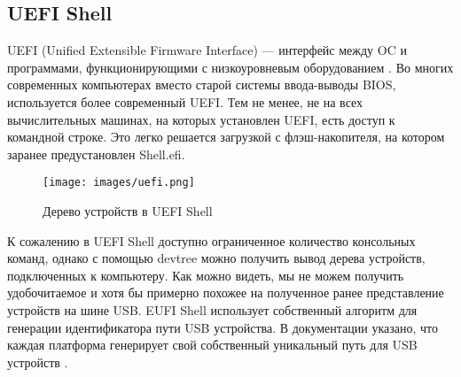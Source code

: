 \subsection{UEFI Shell}
UEFI (Unified Extensible Firmware Interface) — интерфейс между OC и программами, функционирующими с низкоуровневым оборудованием \cite{uefi}.
Во многих современных компьютерах вместо старой системы ввода-выводы BIOS, используется более современный UEFI. Тем не менее, не на всех
вычислительных машинах, на которых установлен UEFI, есть доступ к командной строке. Это легко решается загрузкой с флэш-накопителя, на котором
заранее предустановлен Shell.efi.
\begin{figure}[H]
  \texttt{[image: images/uefi.png]}
  \caption{Дерево устройств в UEFI Shell}
\end{figure}
К сожалению в UEFI Shell доступно ограниченное количество консольных команд, однако с помощью devtree можно получить вывод дерева устройств,
подключенных к компьютеру. Как можно видеть, мы не можем получить удобочитаемое и хотя бы примерно похожее на полученное ранее
представление устройств на шине USB. EUFI Shell использует собственный алгоритм для генерации идентификатора пути USB устройства. В документации
указано, что каждая платформа генерирует свой собственный уникальный путь для USB устройств \cite{key}.
\clearpage
\fi